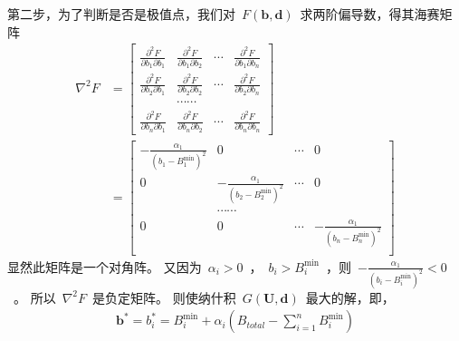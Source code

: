 第二步，为了判断是否是极值点，我们对~$F(\mathbf{b},\mathbf{d})$~求两阶偏导数，得其海赛矩阵
\begin{align*}
    \nabla ^2 F &= \left[
    \begin{array}{cccc}
        \frac{\partial ^2F}{\partial b_{1} \partial b_1} & \frac{\partial ^2F}{\partial b_{1} \partial b_2} & \cdots &  \frac{\partial ^2F}{\partial b_{1} \partial b_n}\\
        \frac{\partial ^2F}{\partial b_{2} \partial b_1} & \frac{\partial ^2F}{\partial b_{2} \partial b_2} & \cdots &  \frac{\partial ^2F}{\partial b_{2} \partial b_n}\\
         & \cdots \cdots & & \\
        \frac{\partial ^2F}{\partial b_{n} \partial b_1} & \frac{\partial ^2F}{\partial b_{n} \partial b_2} & \cdots &  \frac{\partial ^2F}{\partial b_{n} \partial b_n}
    \end{array} 
    \right] \\
    & = \left[
    \begin{array}{cccc}
        -\frac{\alpha_1}{(b_1-B_1^{\min})^2} & 0 & \cdots & 0\\
        0& -\frac{\alpha_1}{(b_2-B_2^{\min})^2} &\cdots& 0\\
        &\cdots\cdots&&\\
        0& 0 &\cdots & -\frac{\alpha_1}{(b_n-B_n^{\min})^2}\\
    \end{array}
    \right]
\end{align*}
显然此矩阵是一个对角阵。
又因为~$\alpha_i>0$~，~$b_i > B_i^{\min}$~，则~$-\frac{\alpha_1}{(b_i-B_i^{\min})^2}<0$~。
所以~$\nabla ^2 F$~是负定矩阵。
则使纳什积~$G(\mathbf{U},\mathbf{d})$~最大的解，即，
\begin{align}
    \mathbf{b}^* = b_i^* = B_i^{\min} + \alpha_i \left( B_{total} - \sum_{i=1}^n B_i^{\min}  \right)
    \label{eqn:chap_nash:nbs}
\end{align}

